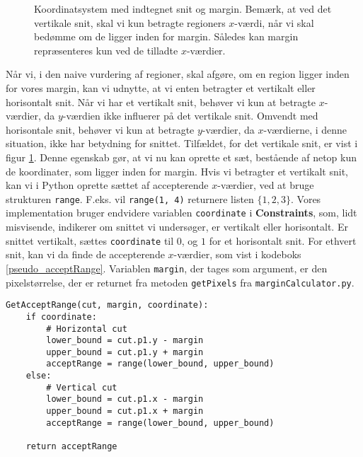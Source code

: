 {\begin{figure}[t]
\begin{picture}
    \end{picture}
    \caption[]{Koordinatsystem med indtegnet snit og margin. Bemærk, at
    ved det vertikale snit, skal vi kun betragte regioners $x$-værdi,
    når vi skal bedømme om de ligger inden for margin. Således kan
    margin repræsenteres kun ved de tilladte $x$-værdier.}
    \label{margin_koordinatsystem}
\end{figure}
Når vi, i den naive vurdering af regioner, skal afgøre, om en region
ligger inden for vores margin, kan vi udnytte, at vi enten betragter et
vertikalt eller horisontalt snit.  Når vi har et vertikalt snit, behøver
vi kun at betragte $x$-værdier, da $y$-værdien ikke influerer på det
vertikale snit. Omvendt med horisontale snit, behøver vi kun at betragte
$y$-værdier, da $x$-værdierne, i denne situation, ikke har betydning for
snittet.  Tilfældet, for det vertikale snit, er vist i figur
\ref{margin_koordinatsystem}.  Denne egenskab gør, at vi nu kan oprette
et sæt, bestående af netop kun de koordinater, som ligger inden for
margin. Hvis vi betragter et vertikalt snit, kan vi i Python oprette
sættet af accepterende $x$-værdier, ved at bruge strukturen
\texttt{range}. F.eks. vil \texttt{range(1, 4)} returnere listen
$\{1,2,3\}$.  Vores implementation bruger endvidere variablen
\texttt{coordinate} i \textbf{Constraints}, som, lidt misvisende,
indikerer om snittet vi undersøger, er vertikalt eller horisontalt. Er
snittet vertikalt, sættes \texttt{coordinate} til $0$, og $1$ for et
horisontalt snit. For ethvert snit, kan vi da finde de accepterende
$x$-værdier, som vist i kodeboks \ref{pseudo_acceptRange}. Variablen
\texttt{margin}, der tages som argument, er den pixelstørrelse, der er
returnet fra metoden \texttt{getPixels} fra
\texttt{marginCalculator.py}.

\begin{lstlisting}[caption={Metode som genererer sættet af accepterende
    koordinater.},captionpos=b,label={pseudo_acceptRange},
    frame=tb, breaklines=false, float=b]
GetAcceptRange(cut, margin, coordinate):
    if coordinate:
        # Horizontal cut
        lower_bound = cut.p1.y - margin
        upper_bound = cut.p1.y + margin
        acceptRange = range(lower_bound, upper_bound)
    else:
        # Vertical cut
        lower_bound = cut.p1.x - margin
        upper_bound = cut.p1.x + margin
        acceptRange = range(lower_bound, upper_bound)

    return acceptRange
\end{lstlisting}

}
